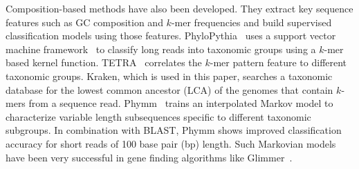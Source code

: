   Composition-based methods have also been developed. They extract key sequence features such as GC composition and $k$-mer frequencies and build supervised
  classification models using those features. PhyloPythia~\cite{McHardy2007} uses a support vector machine framework~\cite{vap95} to classify long reads into taxonomic groups
  using a $k$-mer based kernel function. TETRA~\cite{tetra} correlates the $k$-mer pattern feature to different taxonomic groups. Kraken, which is used in this paper, searches a taxonomic database for the lowest common ancestor (LCA) of the genomes that contain $k$-mers from a sequence read. Phymm~\cite{phymm} trains an interpolated Markov model
  to characterize variable length subsequences  specific to different taxonomic subgroups. In combination with BLAST, Phymm shows improved classification
  accuracy for short reads of 100 base pair (bp) length. Such Markovian models have been very successful in gene finding algorithms like Glimmer~\cite{delc98nucl}.



